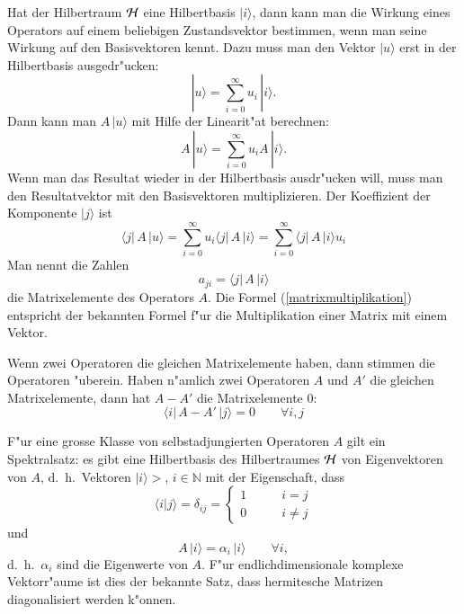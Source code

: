 Hat der Hilbertraum $\cal H$ eine Hilbertbasis $|i\rangle$, dann kann
man die Wirkung eines Operators auf einem beliebigen Zustandsvektor
bestimmen, wenn man seine Wirkung auf den Basisvektoren kennt.
Dazu muss man den Vektor $|u\rangle$ erst in der Hilbertbasis
ausgedr"ucken:
\[
|u\rangle = \sum_{i=0}^\infty u_i\, |i\rangle.
\]
Dann kann man $A\,|u\rangle$ mit Hilfe der Linearit"at berechnen:
\[
A\,|u\rangle = \sum_{i=0}^\infty u_iA\,|i\rangle.
\]
Wenn man das Resultat wieder in der Hilbertbasis ausdr"ucken will, 
muss man den Resultatvektor mit den Basisvektoren multiplizieren.
Der Koeffizient der Komponente $|j\rangle$ ist
\begin{equation}
\langle j|\,A\,|u\rangle
=
\sum_{i=0}^\infty u_i \langle j|\,A\,|i\rangle
=
\sum_{i=0}^\infty \langle j|\,A\,|i\rangle u_i
\label{matrixmultiplikation}
\end{equation}
Man nennt die Zahlen
\[
a_{ji}=\langle j|\,A\,|i\rangle
\]
die Matrixelemente des Operators $A$. Die Formel (\ref{matrixmultiplikation})
entspricht der bekannten Formel f"ur die Multiplikation einer Matrix
mit einem Vektor.

Wenn zwei Operatoren die gleichen Matrixelemente haben, dann stimmen
die Operatoren "uberein. Haben n"amlich zwei Operatoren $A$ und $A'$
die gleichen Matrixelemente, dann hat $A-A'$ die Matrixelemente $0$:
\[
\langle i|\,A-A'\,|j\rangle =0\qquad\forall i,j
\]

F"ur eine grosse Klasse von selbstadjungierten Operatoren $A$ gilt ein
Spektralsatz: es gibt eine Hilbertbasis des Hilbertraumes $\cal H$
von Eigenvektoren von $A$, d.~h.~Vektoren $|i\rangle>$, $i\in\mathbb N$
mit der Eigenschaft, dass 
\[
\langle i|j\rangle = \delta_{ij}=\begin{cases}
1&\qquad i=j\\
0&\qquad i\ne j
\end{cases}
\]
und 
\[
A\,|i\rangle=\alpha_i\,|i\rangle\qquad\forall i,
\]
d.~h.~$\alpha_i$ sind die Eigenwerte von $A$.
F"ur endlichdimensionale komplexe Vektorr"aume ist dies der bekannte
Satz, dass hermitesche Matrizen diagonalisiert werden k"onnen.

